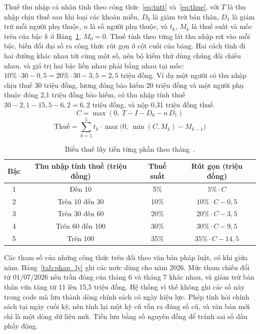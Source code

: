 \documentclass[../DoAn.tex]{subfiles}
\begin{document}
Thuế thu nhập cá nhân tính theo công thức~\eqref{eq:tntt} và~\eqref{eq:thue}, với
$T$ là thu nhập chịu thuế sau khi loại các khoản miễn, $D_0$ là giảm trừ bản thân,
$D_1$ là giảm trừ mỗi người phụ thuộc, $n$ là số người phụ thuộc, và $t_k$, $M_k$ là
thuế suất và mốc trên của bậc $k$ ở Bảng~\ref{tab:bieu_thue}, $M_0 = 0$. Thuế tính
theo từng lát thu nhập rơi vào mỗi bậc, biến đổi đại số ra công thức rút gọn ở cột
cuối của bảng. Hai cách tính đi hai đường khác nhau tới cùng một số, nên bộ kiểm thử
dùng chúng đối chiếu nhau, và giá trị hai bậc liền nhau phải bằng nhau tại mốc: $10\%
\cdot 30 - 0{,}5 = 20\% \cdot 30 - 3{,}5 = 2{,}5$ triệu đồng. Ví dụ một người có
thu nhập chịu thuế 30 triệu đồng, lương đóng bảo hiểm 20 triệu đồng và một người phụ
thuộc đóng 2,1 triệu đồng bảo hiểm, có thu nhập tính thuế $30 - 2{,}1 - 15{,}5 -
6{,}2 = 6{,}2$ triệu đồng, và nộp 0,31 triệu đồng thuế.
\begin{equation}
C = \max(0,\ T - I - D_0 - n\,D_1)
\label{eq:tntt}
\end{equation}
\begin{equation}
\text{Thuế} = \sum_{k=1}^{5} t_k \cdot \max\bigl(0,\ \min(C, M_k) - M_{k-1}\bigr)
\label{eq:thue}
\end{equation}

\begin{table}[!htb]
\centering
\small
\caption{Biểu thuế lũy tiến từng phần theo tháng~\cite{luattncn2025}.}
\label{tab:bieu_thue}
\begin{tabular}{|c|c|c|c|}
\hline
\textbf{Bậc} & \textbf{Thu nhập tính thuế (triệu đồng)} & \textbf{Thuế suất} & \textbf{Rút gọn (triệu đồng)} \\
\hline
1 & Đến 10 & 5\% & $5\% \cdot C$ \\
\hline
2 & Trên 10 đến 30 & 10\% & $10\% \cdot C - 0{,}5$ \\
\hline
3 & Trên 30 đến 60 & 20\% & $20\% \cdot C - 3{,}5$ \\
\hline
4 & Trên 60 đến 100 & 30\% & $30\% \cdot C - 9{,}5$ \\
\hline
5 & Trên 100 & 35\% & $35\% \cdot C - 14{,}5$ \\
\hline
\end{tabular}
\end{table}

Các tham số của những công thức trên đổi theo văn bản pháp luật, có khi giữa năm.
Bảng~\ref{tab:phap_ly} ghi các mức dùng cho năm 2026. Mức tham chiếu đổi từ
01/07/2026 nên trần đóng của tháng 6 và tháng 7 khác nhau, và giảm trừ bản thân
vừa tăng từ 11 lên 15,5 triệu đồng. Hệ thống vì thế không ghi các số này trong
code mà lưu thành dòng chính sách có ngày hiệu lực. Phép tính hỏi chính sách tại
ngày cuối kỳ, nên tính lại một kỳ cũ vẫn ra đúng số cũ, và văn bản mới chỉ là một
dòng dữ liệu mới. Tiền lưu bằng số nguyên đồng để tránh sai số dấu phẩy động.
\end{document}

